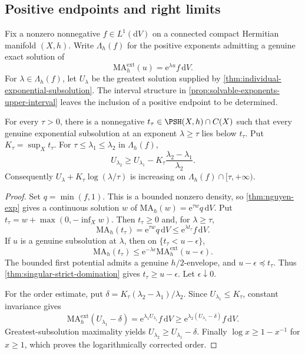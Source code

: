 \subsection{Positive endpoints and right limits}

Fix a nonzero nonnegative $f\in L^1(\mathrm dV)$ on a connected compact Hermitian manifold $(X,h)$. Write $\Lambda_h(f)$ for the positive exponents admitting a genuine exact solution of
\[
 \mathrm{MA}^{\mathrm{ext}}_h(u)=\mathrm e^{\lambda u}f\,\mathrm dV.
\]
For $\lambda\in\Lambda_h(f)$, let $U_\lambda$ be the greatest solution supplied by \cref{thm:individual-exponential-subsolution}. The interval structure in \cref{prop:solvable-exponents-upper-interval} leaves the inclusion of a positive endpoint to be determined.

\begin{lemma}\label{lem:positive-exponent-uniform-upper-barrier}
For every $\tau>0$, there is a nonnegative $t_\tau\in\PSH(X,h)\cap C(X)$ such that every genuine exponential subsolution at an exponent $\lambda\geq\tau$ lies below $t_\tau$. Put $K_\tau=\sup_Xt_\tau$. For $\tau\leq\lambda_1\leq\lambda_2$ in $\Lambda_h(f)$,
\[
 U_{\lambda_2}\geq U_{\lambda_1}
             -K_\tau\frac{\lambda_2-\lambda_1}{\lambda_2}.
\]
Consequently $U_\lambda+K_\tau\log(\lambda/\tau)$ is increasing on $\Lambda_h(f)\cap[\tau,+\infty)$.
\end{lemma}
\begin{proof}
Set $q=\min(f,1)$. This is a bounded nonzero density, so \cref{thm:nguyen-exp} gives a continuous solution $w$ of $\mathrm{MA}_h(w)=\mathrm e^{\tau w}q\,\mathrm dV$. Put $t_\tau=w+\max(0,-\inf_Xw)$. Then $t_\tau\geq0$ and, for $\lambda\geq\tau$,
\[
 \mathrm{MA}_h(t_\tau)=\mathrm e^{\tau w}q\,\mathrm dV
       \leq\mathrm e^{\lambda t_\tau}f\,\mathrm dV.
\]
If $u$ is a genuine subsolution at $\lambda$, then on $\{t_\tau<u-\epsilon\}$,
\[
 \mathrm{MA}_h(t_\tau)
       \leq\mathrm e^{-\lambda\epsilon}
                  \mathrm{MA}^{\mathrm{ext}}_h(u-\epsilon).
\]
The bounded first potential admits a genuine $h/2$-envelope, and $u-\epsilon\preceq t_\tau$. Thus \cref{thm:singular-strict-domination} gives $t_\tau\geq u-\epsilon$. Let $\epsilon\downarrow0$.

For the order estimate, put $\delta=K_\tau(\lambda_2-\lambda_1)/\lambda_2$. Since $U_{\lambda_1}\leq K_\tau$, constant invariance gives
\[
 \mathrm{MA}^{\mathrm{ext}}_h(U_{\lambda_1}-\delta)
   =\mathrm e^{\lambda_1U_{\lambda_1}}f\,\mathrm dV
   \geq\mathrm e^{\lambda_2(U_{\lambda_1}-\delta)}f\,\mathrm dV.
\]
Greatest-subsolution maximality yields $U_{\lambda_2}\geq U_{\lambda_1}-\delta$. Finally $\log x\geq1-x^{-1}$ for $x\geq1$, which proves the logarithmically corrected order.
\end{proof}

